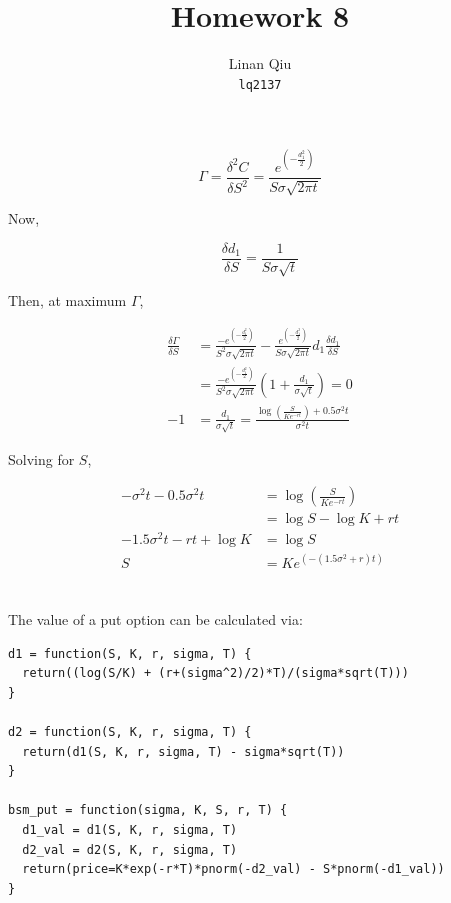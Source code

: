 \documentclass[11pt]{scrartcl}
\title{Homework 8}
\author{Linan Qiu\\\texttt{lq2137}}
\newcommand{\defrac}[2]{\ensuremath{\frac{\delta #1}{\delta #2}}}
\newcommand{\dedefrac}[2]{\ensuremath{\frac{\delta^2 #1}{\delta #2^2}}}
\newcommand{\epower}[1]{\ensuremath{e^{\left(#1\right)}}}
\begin{document}
\maketitle

\section{}

\[\Gamma = \dedefrac{C}{S} = \frac{\epower{-\frac{d_1^2}{2}}}{S\sigma\sqrt{2\pi t}}\]

Now,

\[\defrac{d_1}{S} = \frac{1}{S\sigma\sqrt{t}}\]

Then, at maximum $\Gamma$,

\begin{align*}
\defrac{\Gamma}{S} &= \frac{-\epower{-\frac{d_1^2}{2}}}{S^2\sigma\sqrt{2\pi t}} - \frac{\epower{-\frac{d_1^2}{2}}}{S\sigma\sqrt{2\pi t}} d_1 \defrac{d_1}{S} \\
&= \frac{-\epower{-\frac{d_1^2}{2}}}{S^2\sigma\sqrt{2\pi t}} \left(1 + \frac{d_1}{\sigma \sqrt{t}} \right) = 0 \\
-1 &= \frac{d_1}{\sigma\sqrt{t}} = \frac{\log{\left(\frac{S}{Ke^{-rt}}\right)} + 0.5\sigma^2 t}{\sigma^2 t}
\end{align*}

Solving for $S$,

\begin{align*}
-\sigma^2 t - 0.5 \sigma^2 t &= \log{\left( \frac{S}{Ke^{-rt}} \right)} \\
&= \log{S} - \log{K} + rt \\
-1.5\sigma^2 t - rt + \log{K} &= \log{S} \\
S &= K\epower{-(1.5\sigma^2+r)t}
\end{align*}

\section{}

The value of a put option can be calculated via:

\begin{lstlisting}
d1 = function(S, K, r, sigma, T) {
  return((log(S/K) + (r+(sigma^2)/2)*T)/(sigma*sqrt(T)))
}

d2 = function(S, K, r, sigma, T) {
  return(d1(S, K, r, sigma, T) - sigma*sqrt(T))
}

bsm_put = function(sigma, K, S, r, T) {
  d1_val = d1(S, K, r, sigma, T)
  d2_val = d2(S, K, r, sigma, T)
  return(price=K*exp(-r*T)*pnorm(-d2_val) - S*pnorm(-d1_val))
}
\end{lstlisting}
\end{document}
